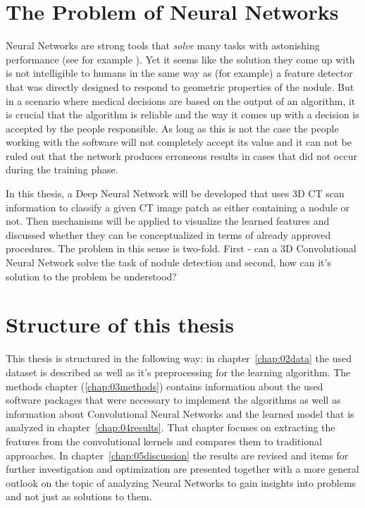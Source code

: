 \documentclass[main.tex]{subfiles}
\begin{document}
\section{The Problem of Neural Networks}
Neural Networks are strong tools that \emph{solve} many tasks with astonishing performance (see for example \cite{silver2017alphagozero}). Yet it seems like the solution they come up with is not intelligible to humans in the same way as (for example) a feature detector that was directly designed to respond to geometric properties of the nodule. But in a scenario where medical decisions are based on the output of an algorithm, it is crucial that the algorithm is reliable and the way it comes up with a decision is accepted by the people responsible. As long as this is not the case the people working with the software will not completely accept its value and it can not be ruled out that the network produces erroneous results in cases that did not occur during the training phase.

In this thesis, a Deep Neural Network will be developed that uses 3D CT scan information to classify a given CT image patch as either containing a nodule or not. Then mechanisms will be applied to visualize the learned features and discussed whether they can be conceptualized in terms of already approved procedures. The problem in this sense is two-fold. First - can a 3D Convolutional Neural Network solve the task of nodule detection and second, how can it's solution to the problem be understood? 


\section{Structure of this thesis}
This thesis is structured in the following way: in chapter~\ref{chap:02data} the used dataset is described as well as it's preprocessing for the learning algorithm. The methods chapter (\ref{chap:03methods}) contains information about the used software packages that were necessary to implement the algorithms as well as information about Convolutional Neural Networks and the learned model that is analyzed in chapter~\ref{chap:04results}. That chapter focuses on extracting the features from the convolutional kernels and compares them to traditional approaches. In chapter~\ref{chap:05discussion} the results are revised and items for further investigation and optimization are presented together with a more general outlook on the topic of analyzing Neural Networks to gain insights into problems and not just as solutions to them. 
\end{document}
